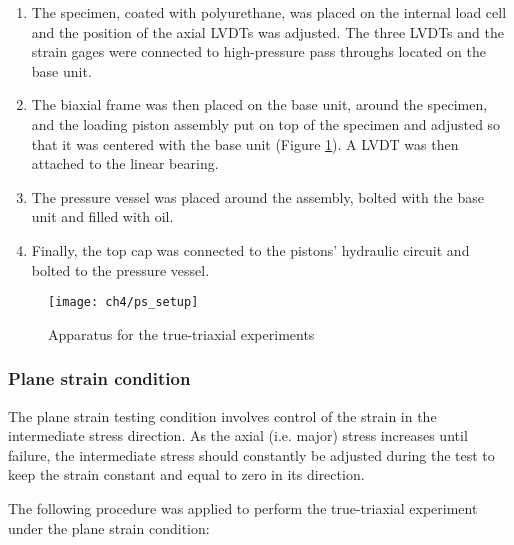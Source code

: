 \begin{enumerate}
    \item The specimen, coated with polyurethane, was placed on the internal load cell and the position of the axial LVDTs was adjusted. The three LVDTs and the strain gages were connected to high-pressure pass throughs located on the base unit. 
    \item The biaxial frame was then placed on the base unit, around the specimen, and the loading piston assembly put on top of the specimen and adjusted so that it was centered with the base unit (Figure \ref{fig4:8}). A LVDT was then attached to the linear bearing. 
    \item The pressure vessel was placed around the assembly, bolted with the base unit and filled with oil. 
    \item Finally, the top cap was connected to the pistons’ hydraulic circuit and bolted to the pressure vessel. 
\end{enumerate}


\begin{figure}[tb]
    \centering
    \texttt{[image: ch4/ps\_setup]}
    \captionsetup{justification=centering}
    \caption{Apparatus for the true-triaxial experiments}
    \label{fig4:8}
\end{figure} 

\subsubsection{Plane strain condition}

The plane strain testing condition involves control of the strain in the intermediate stress direction. As the axial (i.e. major) stress increases until failure, the intermediate stress should constantly be adjusted during the test to keep the strain constant and equal to zero in its direction.

The following procedure was applied to perform the true-triaxial experiment under the plane strain condition:  

